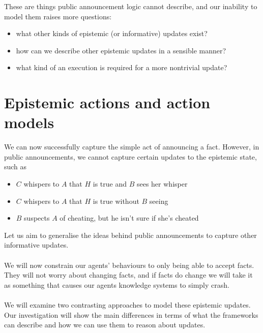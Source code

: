 These are things public announcement logic cannot describe, and our inability to
model them raises more questions:
\begin{itemize}
	\item what other kinds of epistemic (or informative) updates exist?
	\item how can we describe other epistemic updates in a sensible manner?
	\item what kind of an execution is required for a more nontrivial update?
\end{itemize}

\section{Epistemic actions and action models} \label{estAct}
We can now successfully capture the simple act of announcing a fact.
However, in public announcements, we cannot capture certain updates to the
epistemic state, such as
\begin{itemize} 
  \item $C$ whispers to $A$ that $H$ is true and $B$ sees her whisper
  \item $C$ whispers to $A$ that $H$ is true without $B$ seeing
  \item $B$ suspects $A$ of cheating, but he isn't sure if she's cheated
\end{itemize}
Let us aim to generalise the ideas behind public announcements to capture other
informative updates.\\
\\
We will now constrain our agents' behaviours to only being able to accept facts.
They will not worry about changing facts, and if facts do change we will take it
as something that causes our agents knowledge systems to simply crash.\\
\\
We will examine two contrasting approaches to model these epistemic updates.
Our investigation will show the main differences in terms of what the frameworks
can describe and how we can use them to reason about updates.
